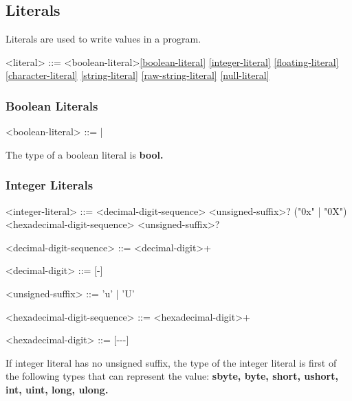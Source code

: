 \documentclass[a4paper,oneside,11pt]{article}
\begin{document}
\subsection{Literals}\label{sec:literals}

Literals are used to write values in a program.

\begin{grammar}
\label{literal}<literal> ::= <boolean-literal>\ref{boolean-literal}
\ref{integer-literal}
\ref{floating-literal}
\ref{character-literal}
\ref{string-literal}
\ref{raw-string-literal}
\ref{null-literal}
\end{grammar}

\subsubsection{Boolean Literals}

\begin{grammar}
\label{boolean-literal}<boolean-literal> ::=  | 
\end{grammar}

The type of a boolean literal is \bf{bool}.

\subsubsection{Integer Literals}

\begin{grammar}
\label{integer-literal}<integer-literal> ::= <decimal-digit-sequence> <unsigned-suffix>?
\alt ("0x" | "0X") <hexadecimal-digit-sequence> <unsigned-suffix>?

<decimal-digit-sequence> ::= <decimal-digit>+

<decimal-digit> ::= [-]

<unsigned-suffix> ::= 'u' | 'U'

<hexadecimal-digit-sequence> ::= <hexadecimal-digit>+

<hexadecimal-digit> ::= [---]

\end{grammar}

If integer literal has no unsigned suffix, the type of the integer literal
is first of the following types that can represent the value:
\bf{sbyte}, \bf{byte}, \bf{short}, \bf{ushort}, \bf{int}, \bf{uint}, \bf{long}, \bf{ulong}.
\end{document}
